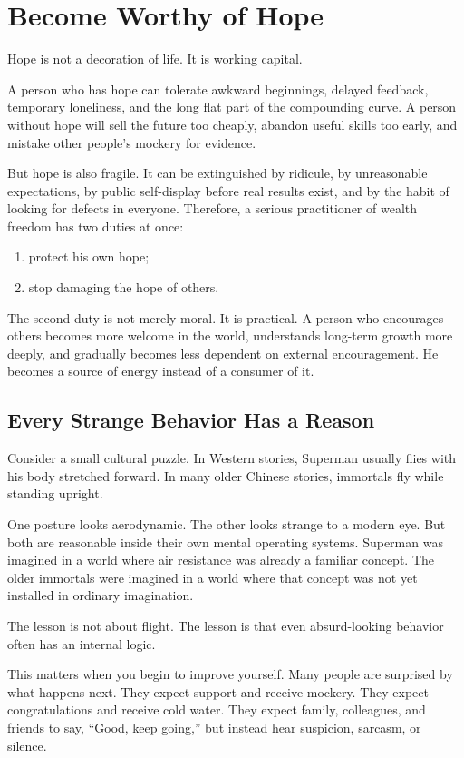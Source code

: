 \chapter{Become Worthy of Hope}

Hope is not a decoration of life. It is working capital.

A person who has hope can tolerate awkward beginnings, delayed feedback, temporary loneliness, and the long flat part of the compounding curve. A person without hope will sell the future too cheaply, abandon useful skills too early, and mistake other people's mockery for evidence.

But hope is also fragile. It can be extinguished by ridicule, by unreasonable expectations, by public self-display before real results exist, and by the habit of looking for defects in everyone. Therefore, a serious practitioner of wealth freedom has two duties at once:

\begin{enumerate}
\item protect his own hope;
\item stop damaging the hope of others.
\end{enumerate}

The second duty is not merely moral. It is practical. A person who encourages others becomes more welcome in the world, understands long-term growth more deeply, and gradually becomes less dependent on external encouragement. He becomes a source of energy instead of a consumer of it.

\section*{Every Strange Behavior Has a Reason}

Consider a small cultural puzzle. In Western stories, Superman usually flies with his body stretched forward. In many older Chinese stories, immortals fly while standing upright.

One posture looks aerodynamic. The other looks strange to a modern eye. But both are reasonable inside their own mental operating systems. Superman was imagined in a world where air resistance was already a familiar concept. The older immortals were imagined in a world where that concept was not yet installed in ordinary imagination.

The lesson is not about flight. The lesson is that even absurd-looking behavior often has an internal logic.

This matters when you begin to improve yourself. Many people are surprised by what happens next. They expect support and receive mockery. They expect congratulations and receive cold water. They expect family, colleagues, and friends to say, ``Good, keep going,'' but instead hear suspicion, sarcasm, or silence.

